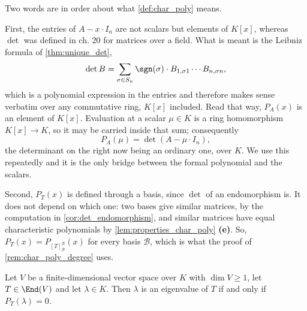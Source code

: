 \begin{remark}
\label{rem:char_poly_well_defined}
Two words are in order about what \cref{def:char_poly} means.

First, the entries of $A - x \cdot I_n$ are not scalars but elements of $K[x]$, whereas $\det$ was defined in ch. 20 for matrices over a field. What is meant is the Leibniz formula of \cref{thm:unique_det},
\[
\det B = \sum_{\sigma \in S_n} \sgn(\sigma) \cdot B_{1,\sigma 1} \cdots B_{n, \sigma n},
\]
which is a polynomial expression in the entries and therefore makes sense verbatim over any commutative ring, $K[x]$ included. Read that way, $P_A(x)$ is an element of $K[x]$. Evaluation at a scalar $\mu \in K$ is a ring homomorphism $K[x] \to K$, so it may be carried inside that sum; consequently
\[
P_A(\mu) = \det(A - \mu \cdot I_n),
\]
the determinant on the right now being an ordinary one, over $K$. We use this repeatedly and it is the only bridge between the formal polynomial and the scalars.

Second, $P_T(x)$ is defined through a basis, since $\det$ of an endomorphism is. It does not depend on which one: two bases give similar matrices, by the computation in \cref{cor:det_endomorphism}, and similar matrices have equal characteristic polynomials by \cref{lem:properties_char_poly} \textbf{(e)}. So, $P_T(x) = P_{[T]_{\mathcal{B}}^{\mathcal{B}}}(x)$ for every basis $\mathcal{B}$, which is what the proof of \cref{rem:char_poly_degree} uses.
\end{remark}

\begin{aiproposition}
\label{aiprop:eigenvalue_iff_root}
Let $V$ be a finite-di\-men\-sional vector space over $K$ with $\dim V \ge 1$, let $T \in \End(V)$ and let $\lambda \in K$. Then $\lambda$ is an eigenvalue of $T$ if and only if $P_T(\lambda) = 0$.
\end{aiproposition}

